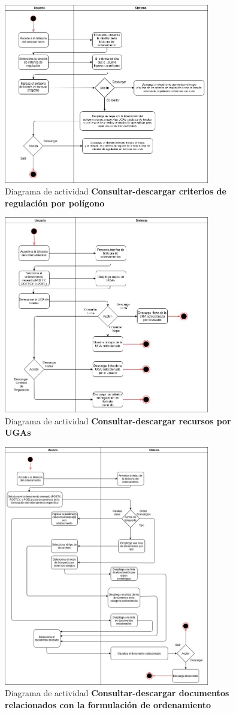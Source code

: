 \begin{figure}[h]
\centering
\caption{Diagrama de actividad \textbf{Consultar-descargar criterios de regulación por polígono}}\label{fig:priorReq}
\includegraphics[width=0.8\textwidth, height=.37\textwidth]{images/diag_act_consultardescargar_critreg_poligono}
\end{figure}



\pagebreak
\begin{figure}[h]
\centering
\caption{Diagrama de actividad \textbf{Consultar-descargar recursos por UGAs}}\label{fig:priorReq}
\includegraphics[width=0.8\textwidth, height=.5\textwidth]{images/diag_act_consultardescargar_UGAs}
\end{figure}

\pagebreak
\begin{figure}[h]
\centering
\caption{Diagrama de actividad \textbf{Consultar-descargar documentos relacionados con la formulación de ordenamiento}}\label{fig:priorReq}
\includegraphics[width=0.8\textwidth, height=.6\textwidth]{images/diag_act_consultardescargar_doc_relac_form}
\end{figure}


